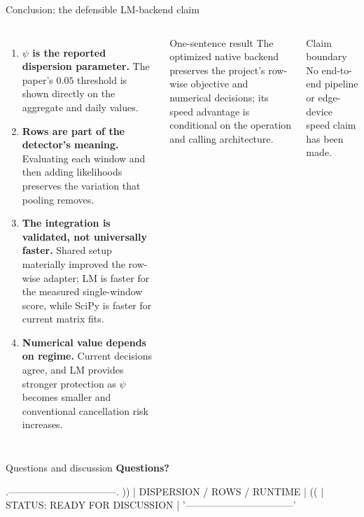 \documentclass[aspectratio=169,10pt]{beamer}
\begin{document}
\begin{frame}{Conclusion: the defensible LM-backend claim}
\small
\begin{columns}[T,onlytextwidth]
\begin{enumerate}
  \item \textbf{$\psi$ is the reported dispersion parameter.}
  The paper's $0.05$ threshold is shown directly on the aggregate and daily
  values.
  \item \textbf{Rows are part of the detector's meaning.}
  Evaluating each window and then adding likelihoods preserves the variation
  that pooling removes.
  \item \textbf{The integration is validated, not universally faster.}
  Shared setup materially improved the row-wise adapter; LM is faster for the
  measured single-window score, while SciPy is faster for current matrix fits.
  \item \textbf{Numerical value depends on regime.}
  Current decisions agree, and LM provides stronger protection as $\psi$
  becomes smaller and conventional cancellation risk increases.
\end{enumerate}

\begin{exampleblock}{One-sentence result}
The optimized native backend preserves the project's row-wise objective and
numerical decisions; its speed advantage is conditional on the operation and
calling architecture.
\end{exampleblock}

\begin{alertblock}{Claim boundary}
No end-to-end pipeline or edge-device speed claim has been made.
\end{alertblock}
\end{columns}
\end{frame}

\begin{frame}[fragile]{Questions and discussion}
\centering
\vspace{0.35cm}
{\Huge\color{burgundy}\textbf{Questions?}}

\vspace{0.75cm}
\begin{center}
\begin{minipage}{0.50\textwidth}
\begin{asciiart}
      .---------------------------------.
  ))  | DISPERSION / ROWS / RUNTIME     |  ((
      | STATUS: READY FOR DISCUSSION   |
      '---------------------------------'
\end{asciiart}
\end{minipage}
\end{center}
\end{frame}
\end{document}
